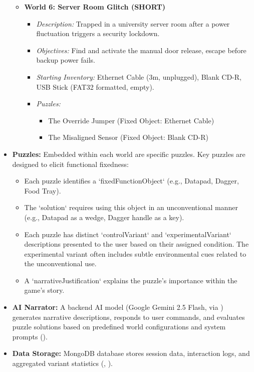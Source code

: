 \documentclass{article}
\begin{document}
\begin{itemize}
\begin{itemize}
\begin{itemize}
\begin{itemize}
                        \end{itemize}
                \end{itemize}
            \item \textbf{World 6: Server Room Glitch (SHORT)}
                \begin{itemize}
                    \item \textit{Description:} Trapped in a university server room after a power fluctuation triggers a security lockdown.
                    \item \textit{Objectives:} Find and activate the manual door release, escape before backup power fails.
                    \item \textit{Starting Inventory:} Ethernet Cable (3m, unplugged), Blank CD-R, USB Stick (FAT32 formatted, empty).
                    \item \textit{Puzzles:}
                        \begin{itemize}
                            \item The Override Jumper (Fixed Object: Ethernet Cable)
                            \item The Misaligned Sensor (Fixed Object: Blank CD-R)
                        \end{itemize}
                \end{itemize}
        \end{itemize}
    \item \textbf{Puzzles:} Embedded within each world are specific puzzles. Key puzzles are designed to elicit functional fixedness:
        \begin{itemize}
            \item Each puzzle identifies a `fixedFunctionObject` (e.g., Datapad, Dagger, Food Tray).
            \item The `solution` requires using this object in an unconventional manner (e.g., Datapad as a wedge, Dagger handle as a key).
            \item Each puzzle has distinct `controlVariant` and `experimentalVariant` descriptions presented to the user based on their assigned condition. The experimental variant often includes subtle environmental cues related to the unconventional use.
            \item A `narrativeJustification` explains the puzzle's importance within the game's story.
        \end{itemize}
    \item \textbf{AI Narrator:} A backend AI model (Google Gemini 2.5 Flash, via ) generates narrative descriptions, responds to user commands, and evaluates puzzle solutions based on predefined world configurations and system prompts ().
    \item \textbf{Data Storage:} MongoDB database stores session data, interaction logs, and aggregated variant statistics (, ).
\end{itemize}
\end{document}
